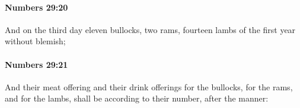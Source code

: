 		\paragraph{Numbers 29:20} %
			\label{NUMBERS-29-20}

			And on the third day eleven bullocks, two rams, fourteen lambs of the first year without blemish;


		\paragraph{Numbers 29:21} %
			\label{NUMBERS-29-21}

			And their meat offering and their drink offerings for the bullocks, for the rams, and for the lambs, shall be according to their number, after the manner:



